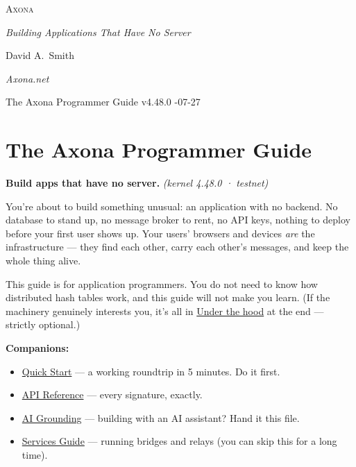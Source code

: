 \documentclass[
  nobib]{tufte-handout}
\author{}
\date{}
\providecommand{\tightlist}{%
  \setlength{\itemsep}{0pt}\setlength{\parskip}{0pt}}
\begin{document}
\thispagestyle{empty}
\null\vfill
\begin{center}
{\fontsize{48}{52}\selectfont \textsc{Axona}\par}
\vspace{0.6em}
{\Large\itshape Building Applications That Have No Server\par}
\vspace{4em}
{\large David A.~Smith\par}
{\itshape\small Axona.net\par}
\vspace{2em}
{\small The Axona Programmer Guide \quad v4.48.0 -07-27\par}
\end{center}
\vfill
\null
\newpage
\pagestyle{ndhtplain}
\thispagestyle{ndhtplain}
\setcounter{page}{1}

\section{The Axona Programmer Guide}\label{the-axona-programmer-guide}

\textbf{Build apps that have no server.} \emph{(kernel 4.48.0 ·
testnet)}

You're about to build something unusual: an application with no backend.
No database to stand up, no message broker to rent, no API keys, nothing
to deploy before your first user shows up. Your users' browsers and
devices \emph{are} the infrastructure --- they find each other, carry
each other's messages, and keep the whole thing alive.

This guide is for application programmers. You do not need to know how
distributed hash tables work, and this guide will not make you learn.
(If the machinery genuinely interests you, it's all in
\hyperref[9-under-the-hood--optional]{Under the hood} at the end ---
strictly optional.)

\textbf{Companions:}

\begin{itemize}
\tightlist
\item
  \href{Quick-Start-v4.48.0.md}{Quick Start} --- a working roundtrip in
  5 minutes. Do it first.
\item
  \href{Axona-API-Reference-v4.48.0.md}{API Reference} --- every
  signature, exactly.
\item
  \href{Axona-AI-Grounding-v4.48.0.md}{AI Grounding} --- building with
  an AI assistant? Hand it this file.
\item
  \href{Axona-Services-Guide-v4.48.0.md}{Services Guide} --- running
  bridges and relays (you can skip this for a long time).
\end{itemize}
\end{document}
